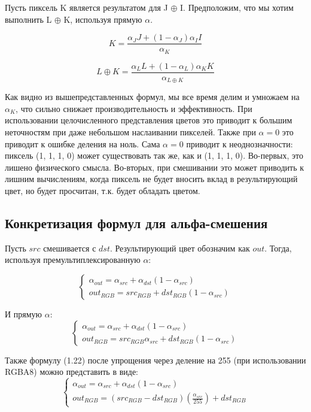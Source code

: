 Пусть пиксель K является результатом для  J $\oplus$ I. Предположим, что мы хотим выполнить L $\oplus$ K, используя прямую $\alpha$.

\begin{equation}
K = \frac{\alpha_{J}J + (1-\alpha_{J})\alpha_{I}I}{\alpha_{K}}
\end{equation}

\begin{equation}
L \oplus K = \frac{\alpha_{L}L + (1-\alpha_{L})\alpha_{K}K}{\alpha_{L \oplus K}}
\end{equation}

Как видно из вышепредставленных формул, мы все время делим и умножаем на $\alpha_{K}$, что сильно снижает производительность и эффективность. При использовании целочисленного представления цветов это приводит к большим неточностям при даже небольшом наслаивании пикселей. Также при $\alpha = 0$ это приводит к ошибке деления на ноль. Сама $\alpha = 0$ приводит к неоднозначности: пиксель (1, 1, 1, 0) может существовать так же, как и (1, 1, 1, 0). Во-первых, это лишено физического смысла. Во-вторых, при смешивании это может приводить к лишним вычислениям, когда пиксель не будет вносить вклад в результирующий цвет, но будет просчитан, т.к. будет обладать цветом. 

\subsection{Конкретизация формул для альфа-смешения}
Пусть $src$ смешивается с $dst$. Результирующий цвет обозначим как $out$.
Тогда, используя премультиплексированную $\alpha$: 

\begin{equation}
\begin{cases} \alpha_{out}= \alpha_{src} + \alpha_{dst}(1- \alpha_{src}) \\
out_{RGB} = src_{RGB} + dst_{RGB}(1-\alpha_{src})
\end{cases}
\end{equation}

И прямую $\alpha$:
\begin{equation}
\begin{cases} 
\alpha_{out}= \alpha_{src} + \alpha_{dst}(1- \alpha_{src}) \\
out_{RGB} = src_{RGB}\alpha_{src} + dst_{RGB}(1 - \alpha_{src})
\end{cases}
\end{equation}

Также формулу (1.22) после упрощения через деление на 255 (при использовании RGBA8)  можно представить в виде:
\begin{equation}
\begin{cases} 
\alpha_{out}= \alpha_{src} + \alpha_{dst}(1- \alpha_{src}) \\
out_{RGB} = (src_{RGB} - dst_{RGB}) (\frac{\alpha_{src}}{255} ) + dst_{RGB}
\end{cases}
\end{equation}
 

